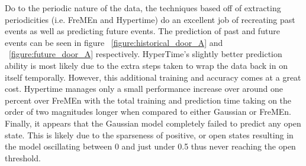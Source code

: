 Do to the periodic nature of the data, the techniques based off of extracting
periodicities (i.e. FreMEn and Hypertime) do an excellent job of recreating
past events as well as predicting future events. The prediction of past and future events can be seen in
figure ~\ref{figure:historical_door_A} and ~\ref{figure:future_door_A} respectively. HyperTime's slightly better
prediction ability is most likely due to the extra steps taken to wrap the data back
in on itself temporally. However, this additional training and accuracy comes at a
great cost. Hypertime manages only a small performance increase over
around one percent over FreMEn with the total training and prediction time
taking on the order of two magnitudes longer when compared to either Gaussian or FreMEn.
Finally, it appears that the Gaussian model completely failed to predict any
open state. This is likely due to the sparseness of positive, or open
states resulting in the model oscillating between 0 and just under 0.5 thus
never reaching the open threshold. \\

